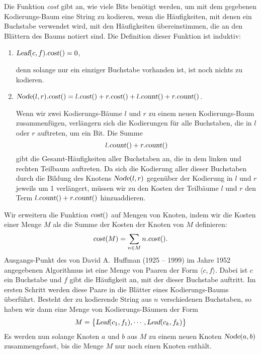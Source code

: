 Die Funktion \textsl{cost} gibt an, wie viele Bits ben\"otigt werden, um mit dem gegebenen
Kodierungs-Baum eine String zu kodieren, wenn die H\"aufigkeiten, mit denen ein Buchstabe
verwendet wird, mit den H\"aufigkeiten \"ubereinstimmen, die an den Bl\"attern des Baums notiert
sind.  Die Definition dieser Funktion ist induktiv:
\begin{enumerate}
\item $\textsl{Leaf}(c,f).\textsl{cost}() = 0$,

      denn solange nur ein einziger Buchstabe vorhanden ist, ist noch nichts zu kodieren.
\item $\textsl{Node}(l,r).\textsl{cost}() = 
       l.\textsl{cost}() + r.\textsl{cost}() + l.\textsl{count}() + r.\textsl{count}()$.

      Wenn wir zwei Kodierungs-B\"aume $l$ und $r$ zu einem neuen Kodierungs-Baum
      zusammenf\"ugen, verl\"angern sich die Kodierungen f\"ur alle Buchstaben, die in $l$ oder
      $r$ auftreten, um ein Bit.
      Die Summe 
      \[ l.\textsl{count}() + r.\textsl{count}() \]
      gibt die Gesamt-H\"aufigkeiten aller Buchstaben an, die in dem linken und
      rechten Teilbaum auftreten.  Da sich die Kodierung aller dieser Buchstaben
      durch die Bildung des Knotens $\textsl{Node}(l,r)$ gegen\"uber der Kodierung in $l$
      und $r$ jeweils um 1 verl\"angert, m\"ussen wir zu den Kosten der Teilb\"aume $l$ und $r$
      den Term $l.\textsl{count}() + r.\textsl{count}()$ hinzuaddieren.
\end{enumerate}
Wir erweitern die Funktion $\textsl{cost}()$ auf Mengen von Knoten, indem wir die Kosten
einer Menge $M$ als die Summe der Kosten der Knoten von $M$ definieren:
\[ \textsl{cost}(M) = \sum\limits_{n\in M} n.\textsl{cost}(). \]
Ausgangs-Punkt des von David A.~Huffman (1925 -- 1999) im Jahre 1952 angegebenen
Algorithmus \cite{huffman:52} ist eine Menge von Paaren der Form $\langle c, f\rangle$.  Dabei ist
$c$ ein 
Buchstabe und $f$ gibt die H\"aufigkeit an, mit der dieser Buchstabe auftritt.  Im ersten
Schritt werden diese Paare in die Bl\"atter eines Kodierungs-Baums \"uberf\"uhrt.  Besteht der
zu kodierende String aus  $n$ verschiedenen Buchstaben, so haben
wir dann eine Menge von Kodierungs-B\"aumen der Form
\begin{equation}
  \label{eq:huffmann1}
 M = \bigl\{  \textsl{Leaf}(c_1, f_1), \cdots, \textsl{Leaf}(c_k, f_k) \bigr\}   
\end{equation}
Es werden nun solange Knoten $a$ und $b$ aus $M$ zu einem neuen Knoten
$\textsl{Node}(a,b)$ zusammengefasst, bis die Menge $M$ nur noch einen Knoten enth\"alt.
